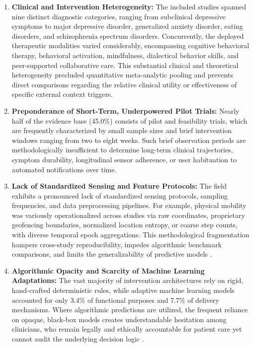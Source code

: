 \begin{enumerate}[label=\textbf{\arabic*.}]
    \item \textbf{Clinical and Intervention Heterogeneity:} The included studies spanned nine distinct diagnostic categories, ranging from subclinical depressive symptoms to major depressive disorder, generalized anxiety disorder, eating disorders, and schizophrenia spectrum disorders. Concurrently, the deployed therapeutic modalities varied considerably, encompassing cognitive behavioral therapy, behavioral activation, mindfulness, dialectical behavior skills, and peer-supported collaborative care. This substantial clinical and theoretical heterogeneity precluded quantitative meta-analytic pooling and prevents direct comparisons regarding the relative clinical utility or effectiveness of specific external context triggers.
    
    \item \textbf{Preponderance of Short-Term, Underpowered Pilot Trials:} Nearly half of the evidence base (45.0\%) consists of pilot and feasibility trials, which are frequently characterized by small sample sizes and brief intervention windows ranging from two to eight weeks. Such brief observation periods are methodologically insufficient to determine long-term clinical trajectories, symptom durability, longitudinal sensor adherence, or user habituation to automated notifications over time.
    
    \item \textbf{Lack of Standardized Sensing and Feature Protocols:} The field exhibits a pronounced lack of standardized sensing protocols, sampling frequencies, and data preprocessing pipelines. For example, physical mobility was variously operationalized across studies via raw coordinates, proprietary geofencing boundaries, normalized location entropy, or coarse step counts, with diverse temporal epoch aggregations. This methodological fragmentation hampers cross-study reproducibility, impedes algorithmic benchmark comparisons, and limits the generalizability of predictive models \cite{leaning2024smartphone, deangel2022passivemonitoring}.
    
    \item \textbf{Algorithmic Opacity and Scarcity of Machine Learning Adaptations:} The vast majority of intervention architectures rely on rigid, hand-crafted deterministic rules, while adaptive machine learning models accounted for only 3.4\% of functional purposes and 7.7\% of delivery mechanisms. Where algorithmic predictions are utilized, the frequent reliance on opaque, black-box models creates understandable hesitation among clinicians, who remain legally and ethically accountable for patient care yet cannot audit the underlying decision logic \cite{rogan2024health, adler2024actionablesensing}.
    

\end{enumerate}
